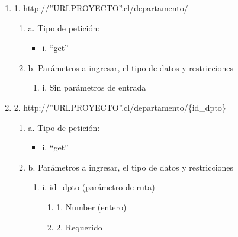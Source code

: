 \begin{enumerate}
    \item 1. http://”URLPROYECTO”.cl/departamento/
    \begin{enumerate}
        \item a. Tipo de petición:
            \begin{itemize}
               \item i. “get”
            \end{itemize}
        \item b. Parámetros a ingresar, el tipo de datos y restricciones
            \begin{enumerate}
                \item i. Sin parámetros de entrada
            \end{enumerate}
    \end{enumerate}

    \item 2. http://”URLPROYECTO”.cl/departamento/\{id\_dpto\}
    \begin{enumerate}
        \item a. Tipo de petición:
            \begin{itemize}
               \item i. “get”
            \end{itemize}
        \item b. Parámetros a ingresar, el tipo de datos y restricciones
            \begin{enumerate}
                \item i. id\_dpto (parámetro de ruta)
                    \begin{enumerate}
                        \item 1. Number (entero)
                        \item 2. Requerido
                    \end{enumerate}
            \end{enumerate}
    \end{enumerate}


\end{enumerate}
